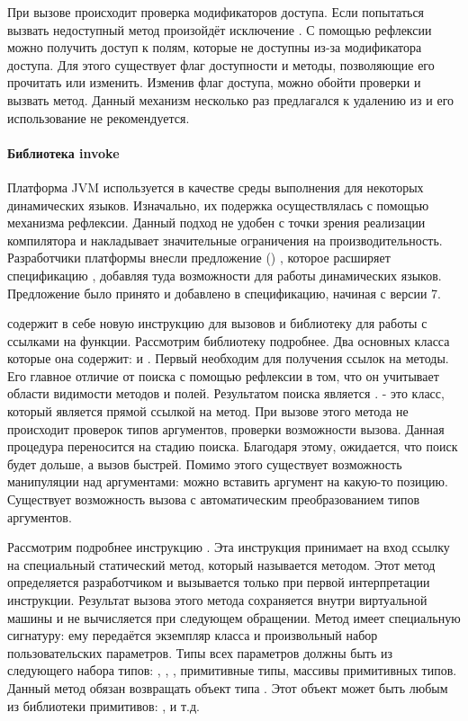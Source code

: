 При вызове происходит проверка модификаторов доступа. Если попытаться вызвать недоступный метод произойдёт исключение . С помощью рефлексии можно получить доступ к полям, которые не доступны из-за модификатора доступа. Для этого существует флаг доступности и методы, позволяющие его прочитать или изменить. Изменив флаг доступа, можно обойти проверки и вызвать метод. Данный механизм несколько раз предлагался к удалению из  и его использование не рекомендуется.

\paragraph{Библиотека invoke}
  Платформа JVM используется в качестве среды выполнения для некоторых динамических языков. Изначально, их подержка осуществлялась с помощью механизма рефлексии. Данный подход не удобен с точки зрения реализации компилятора и накладывает значительные ограничения на производительность. Разработчики платформы внесли предложение () , которое расширяет спецификацию , добавляя туда возможности для работы динамических языков\cite{jvm:jsr292}. Предложение было принято и добавлено в спецификацию, начиная с версии 7.

 содержит в себе новую инструкцию для вызовов  и библиотеку для работы с ссылками на функции. Рассмотрим библиотеку подробнее. Два основных класса которые она содержит:  и . Первый необходим для получения ссылок на методы. Его главное отличие от поиска с помощью рефлексии в том, что он учитывает области видимости методов и полей. Результатом поиска является .  - это класс, который является прямой ссылкой на метод. При вызове этого метода не происходит проверок типов аргументов, проверки возможности вызова. Данная процедура переносится на стадию поиска. Благодаря этому, ожидается, что поиск будет дольше, а вызов быстрей. Помимо этого существует возможность манипуляции над аргументами: можно вставить аргумент на какую-то позицию. Существует возможность вызова с автоматическим преобразованием типов аргументов.

Рассмотрим подробнее инструкцию . Эта инструкция принимает на вход ссылку на специальный статический метод, который называется  методом. Этот метод определяется разработчиком и вызывается только при первой интерпретации инструкции. Результат вызова этого метода сохраняется внутри виртуальной машины и не вычисляется при следующем обращении. Метод имеет специальную сигнатуру: ему передаётся экземпляр класса  и произвольный набор пользовательских параметров. Типы всех параметров должны быть из следующего набора типов: , , , примитивные типы, массивы примитивных типов. Данный метод обязан возвращать объект типа . Этот объект может быть любым  из библиотеки примитивов: ,  и т.д.

